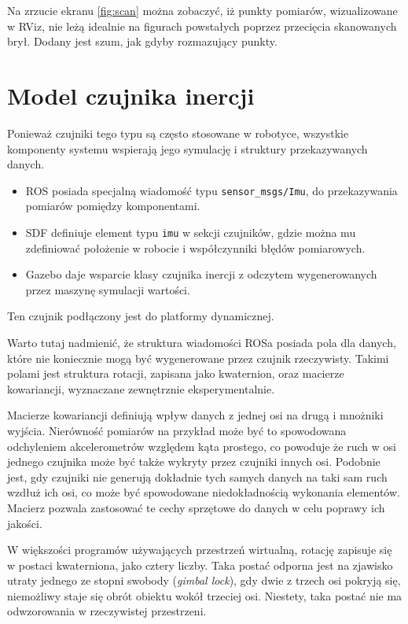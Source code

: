 			Na zrzucie ekranu \ref{fig:scan} można zobaczyć, iż punkty pomiarów, wizualizowane w RViz, nie leżą idealnie na figurach powstałych poprzez przecięcia skanowanych brył.
			Dodany jest szum, jak gdyby rozmazujący punkty.

\section{Model czujnika inercji}
	Ponieważ czujniki tego typu są często stosowane w robotyce, wszystkie komponenty systemu wspierają jego symulację i struktury przekazywanych danych.
	\begin{itemize}
		\item ROS posiada specjalną wiadomość typu \texttt{sensor\_msgs/Imu}, do przekazywania pomiarów pomiędzy komponentami.
		\item SDF definiuje element typu \texttt{imu} w sekcji czujników, gdzie można mu zdefiniować położenie w robocie i współczynniki błędów pomiarowych.
		\item Gazebo daje wsparcie klasy czujnika inercji z odczytem wygenerowanych przez maszynę symulacji wartości.
	\end{itemize}
	
	Ten czujnik podłączony jest do platformy dynamicznej.
	
	Warto tutaj nadmienić, że struktura wiadomości ROSa posiada pola dla danych, które nie koniecznie mogą być wygenerowane przez czujnik rzeczywisty.
	Takimi polami jest struktura rotacji, zapisana jako kwaternion, oraz macierze kowariancji, wyznaczane zewnętrznie eksperymentalnie.
	
	Macierze kowariancji definiują wpływ danych z jednej osi na drugą i mnożniki wyjścia. 
	Nierówność pomiarów na przykład może być to spowodowana odchyleniem akcelerometrów względem kąta prostego, co powoduje że ruch w osi jednego czujnika może
	być także wykryty przez czujniki innych osi. 
	Podobnie jest, gdy czujniki nie generują dokładnie tych samych danych na taki sam ruch wzdłuż ich osi, co może być spowodowane niedokładnością wykonania elementów.
	Macierz pozwala zastosować te cechy sprzętowe do danych w celu poprawy ich jakości.
	
	W większości programów używających przestrzeń wirtualną, rotację zapisuje się w postaci kwaterniona, jako cztery liczby.
	Taka postać odporna jest na zjawisko utraty jednego ze stopni swobody (\emph{gimbal lock}), gdy dwie z trzech osi pokryją się, niemożliwy staje się obrót obiektu wokół trzeciej osi. Niestety, taka postać nie ma odwzorowania w rzeczywistej przestrzeni.
	
